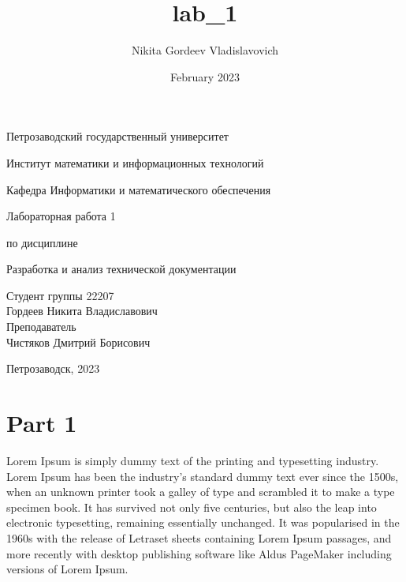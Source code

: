 \documentclass{article}
\title{lab_1}
\author{Nikita Gordeev Vladislavovich}
\date{February 2023}
\begin{document}
\begin{titlepage}

\thispagestyle{empty}

\centerline{Петрозаводский государственный университет}
\centerline{Институт математики и информационных технологий}
\centerline{Кафедра Информатики и математического обеспечения}

\vfill

\centerline{\huge{Лабораторная работа 1}}
\vspace{5px}
\centerline{\large{по дисциплине}}
\vspace{5px}
\centerline{\LARGE{Разработка и анализ технической документации}}

\vfill

\begin{flushright}
\parbox{8cm}{%
Студент группы 22207\\ 
Гордеев Никита Владиславович \\
Преподаватель \\
Чистяков Дмитрий Борисович \\
}
\end{flushright}


\vfill

\centerline{Петрозаводск, 2023}
\clearpage
\end{titlepage}

\newpage
\tableofcontents

\maketitle

\section{Part 1}

Lorem Ipsum is simply dummy text of the printing and typesetting industry. Lorem Ipsum has been the industry's standard dummy text ever since the 1500s, when an unknown printer took a galley of type and scrambled it to make a type specimen book. It has survived not only five centuries, but also the leap into electronic typesetting, remaining essentially unchanged. It was popularised in the 1960s with the release of Letraset sheets containing Lorem Ipsum passages, and more recently with desktop publishing software like Aldus PageMaker including versions of Lorem Ipsum.
\end{document}
